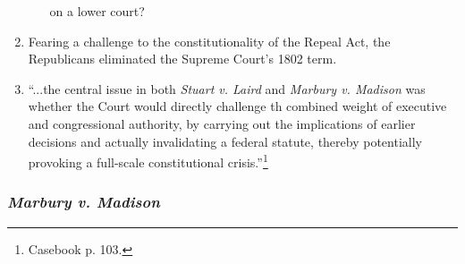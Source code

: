 \begin{enumerate}
\begin{enumerate}
        on a lower court?
    \end{enumerate}
    \item Fearing a challenge to the constitutionality of the Repeal Act, the 
    Republicans eliminated the Supreme Court's 1802 term.
    \item ``...the central issue in both \emph{Stuart v. Laird} and 
    \emph{Marbury v. Madison} was whether the Court would directly challenge 
    th combined weight of executive and congressional authority, by carrying 
    out the implications of earlier decisions and actually invalidating a 
    federal statute, thereby potentially provoking a full-scale constitutional 
    crisis.''\footnote{Casebook p. 103.}
\end{enumerate}

\subsubsection{\emph{Marbury v. Madison}}

